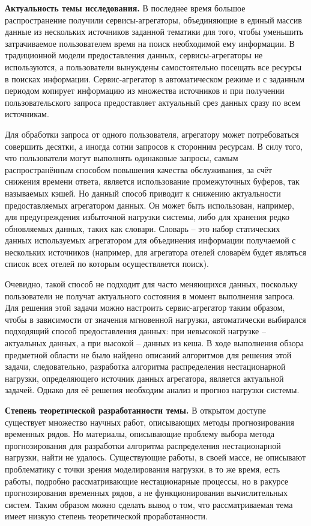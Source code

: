 {\bfseries Актуальность темы исследования.} 
В последнее время большое распространение получили 
сервисы-агрегаторы, объединяющие в единый массив данные из нескольких источников
заданной тематики для того, чтобы уменьшить затрачиваемое пользователем
время на поиск необходимой ему информации.
В традиционной модели предоставления данных, сервисы-агрегаторы не используются, 
а пользователи вынуждены самостоятельно посещать все ресурсы в поисках информации.
Сервис-агрегатор в автоматическом режиме и с заданным периодом копирует информацию из
множества источников и при получении пользовательского запроса
предоставляет актуальный срез данных сразу по всем источникам.

Для обработки запроса от одного пользователя, агрегатору может 
потребоваться совершить десятки, а иногда сотни запросов к сторонним 
ресурсам. В силу того, что пользователи могут выполнять одинаковые запросы,
самым распространённым способом повышения качества обслуживания,
за счёт снижения времени ответа,
является использование промежуточных буферов, так называемых кэшей. Но 
данный способ приводит к снижению актуальности предоставляемых 
агрегатором данных. Он может быть использован, например, для предупреждения 
избыточной нагрузки системы, либо для хранения редко обновляемых данных, 
таких как словари. Словарь -- это набор статических данных используемых 
агрегатором для объединения информации получаемой с нескольких источников 
(например, для агрегатора отелей словарём будет являться список всех отелей 
по которым осуществляется поиск). 

Очевидно, такой способ не подходит для часто меняющихся данных, поскольку
пользователи не получат актуального состояния в момент выполнения запроса.
Для решения этой задачи можно настроить сервис-агрегатор таким образом,
чтобы в зависимости от значения мгновенной нагрузки, автоматически
выбирался подходящий способ предоставления данных: при невысокой нагрузке -- 
актуальных данных, а при высокой -- данных из кеша.
В ходе выполнения обзора предметной области не было найдено описаний
алгоритмов для решения этой задачи, следовательно, 
разработка алгоритма распределения нестационарной нагрузки, 
определяющего источник данных агрегатора, является актуальной задачей. 
Однако для её решения необходим анализ и прогноз нагрузки системы.

{\bfseries Степень теоретической разработанности темы.}
В открытом доступе существует множество научных работ, описывающих 
методы прогнозирования временных рядов. Но материалы, описывающие 
проблему выбора метода прогнозирования для разработки алгоритма 
распределения нестационарной нагрузки, найти не удалось. 
Существующие работы, в своей массе, не описывают проблематику с точки зрения 
моделирования нагрузки, в то же время, есть работы, подробно рассматривающие
нестационарные процессы, но в ракурсе прогнозирования временных рядов,
а не функционирования вычислительных систем.
Таким образом можно сделать вывод о том, что рассматриваемая тема имеет низкую степень 
теоретической проработанности.

